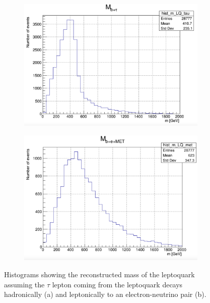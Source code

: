 \begin{figure}
    \centering
    \begin{subfigure}{.5\textwidth}
      \centering
      \includegraphics[width=\linewidth]{images/M-b_tau-electrons.png}
      \caption{}
      \label{fig:had-e}
    \end{subfigure}%
    \begin{subfigure}{.5\textwidth}
      \centering
      \includegraphics[width=\linewidth]{images/m-b_e.png}
      \caption{}
      \label{fig:lep-e}
    \end{subfigure}
    \caption{Histograms showing the reconstructed mass of the leptoquark assuming the $\tau$ lepton coming from the leptoquark decays hadronically (a) and leptonically to an electron-neutrino pair (b).}
    \label{fig:recons_mass_e}
\end{figure}

